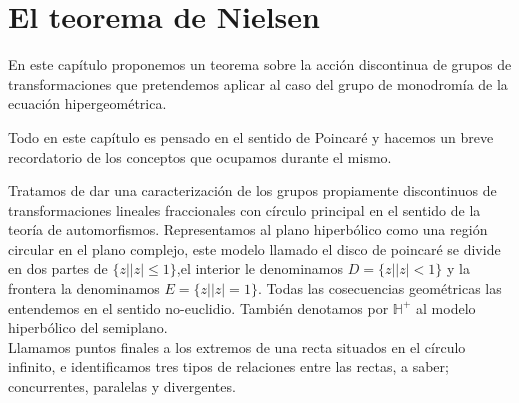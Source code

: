



\chapter{El teorema de Nielsen}
\label{cha:El teorema de Nielsen}





En este cap\'itulo proponemos un teorema sobre la acci\'on discontinua de  grupos de transformaciones que pretendemos aplicar al caso del grupo de monodrom\'ia de la ecuaci\'on hipergeom\'etrica.

Todo en  este cap\'itulo es pensado en el sentido de Poincar\'e y hacemos un breve recordatorio de los conceptos que ocupamos durante el mismo.

Tratamos de dar una caracterizaci\'on de los grupos propiamente discontinuos de transformaciones lineales fraccionales con c\'irculo principal en el sentido de la teor\'ia de automorfismos.
Representamos al plano hiperb\'olico como una regi\'on circular en el plano complejo, este modelo llamado el disco de poincar\'e se divide en dos partes de $\lbrace z | |z| \leq 1 \rbrace$,el interior
le denominamos $D =\lbrace z | |z| <1 \rbrace$ y la frontera la denominamos  $E =\lbrace z| |z| =1  \rbrace$.  Todas las cosecuencias geom\'etricas las entendemos en el sentido no-euclidio. Tambi\'en denotamos por $\mathbb{H} ^{+}$ al modelo hiperb\'olico del semiplano.\\



Llamamos puntos finales a los extremos de una recta situados en
el c\'irculo infinito, e identificamos tres tipos de relaciones entre las rectas, a saber;
concurrentes, paralelas y divergentes. \\

